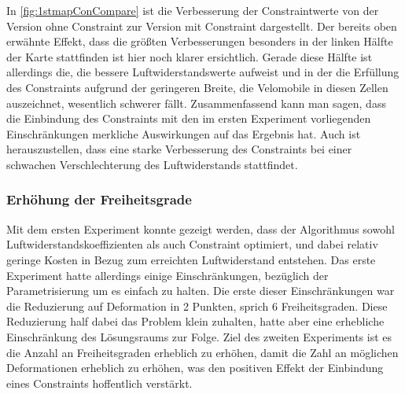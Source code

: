 In  \cref{fig:1stmapConCompare} ist die Verbesserung der Constraintwerte von der Version ohne Constraint zur Version mit Constraint dargestellt.
Der bereits oben erwähnte Effekt, dass die größten Verbesserungen besonders in der linken Hälfte der Karte stattfinden ist hier noch klarer ersichtlich.
Gerade diese Hälfte ist allerdings die, die bessere Luftwiderstandswerte aufweist und in der die Erfüllung des Constraints aufgrund der geringeren Breite, die Velomobile in diesen Zellen auszeichnet, wesentlich schwerer fällt.
Zusammenfassend kann man sagen, dass die Einbindung des Constraints mit den im ersten Experiment vorliegenden Einschränkungen merkliche Auswirkungen auf das Ergebnis hat.
Auch ist herauszustellen, dass eine starke Verbesserung des Constraints bei einer schwachen Verschlechterung des Luftwiderstands stattfindet.

\subsubsection{Erhöhung der Freiheitsgrade}
\label{sub:exp2nd}
Mit dem ersten Experiment konnte gezeigt werden, dass der Algorithmus sowohl Luftwiderstandskoeffizienten als auch Constraint optimiert, und dabei relativ geringe Kosten in Bezug zum erreichten Luftwiderstand entstehen.
Das erste Experiment hatte allerdings einige Einschränkungen, bezüglich der Parametrisierung um es einfach zu halten.
Die erste dieser Einschränkungen war die Reduzierung auf Deformation in 2 Punkten, sprich 6 Freiheitsgraden.
Diese Reduzierung half dabei das Problem klein zuhalten, hatte aber eine erhebliche Einschränkung des Lösungsraums zur Folge.
Ziel des zweiten Experiments ist es die Anzahl an Freiheitsgraden erheblich zu erhöhen, damit die Zahl an möglichen Deformationen erheblich zu erhöhen, was den positiven Effekt der Einbindung eines Constraints hoffentlich verstärkt.

